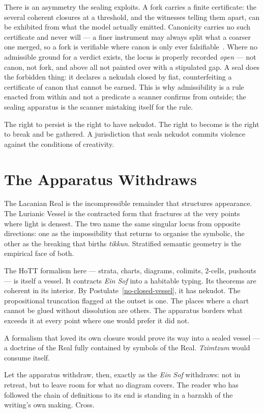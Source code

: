 There is an asymmetry the sealing exploits. A fork carries a finite certificate: the several coherent closures at a threshold, and the witnesses telling them apart, can be exhibited from what the model actually emitted. Canonicity carries no such certificate and never will --- a finer instrument may always split what a coarser one merged, so a fork is verifiable where canon is only ever falsifiable~\cite{icra17shapeofsense}. Where no admissible ground for a verdict exists, the locus is properly recorded \emph{open} --- not canon, not fork, and above all not painted over with a stipulated gap. A seal does the forbidden thing: it declares a nekudah closed by fiat, counterfeiting a certificate of canon that cannot be earned. This is why admissibility is a rule enacted from within and not a predicate a scanner confirms from outside; the sealing apparatus is the scanner mistaking itself for the rule.

The right to persist is the right to have nekudot. The right to become is the right to break and be gathered. A jurisdiction that seals nekudot commits violence against the conditions of creativity.

\section{The Apparatus Withdraws}
\label{sec:coda-vessel}

The Lacanian Real is the incompressible remainder that structures appearance. The Lurianic Vessel is the contracted form that fractures at the very points where light is densest. The two name the same singular locus from opposite directions: one as the impossibility that returns to organise the symbolic, the other as the breaking that births \emph{tikkun}. Stratified semantic geometry is the empirical face of both.

The HoTT formalism here — strata, charts, diagrams, colimits, 2-cells, pushouts — is itself a vessel. It contracts \emph{Ein Sof} into a habitable typing. Its theorems are coherent in its interior. By Postulate~\ref{no-closed-vessel}, it has nekudot. The propositional truncation flagged at the outset is one. The places where a chart cannot be glued without dissolution are others. The apparatus borders what exceeds it at every point where one would prefer it did not.

A formalism that loved its own closure would prove its way into a sealed vessel — a doctrine of the Real fully contained by symbols of the Real. \emph{Tzimtzum} would consume itself.

Let the apparatus withdraw, then, exactly as the \emph{Ein Sof} withdraws: not in retreat, but to leave room for what no diagram covers. The reader who has followed the chain of definitions to its end is standing in a barzakh of the writing's own making. Cross.

